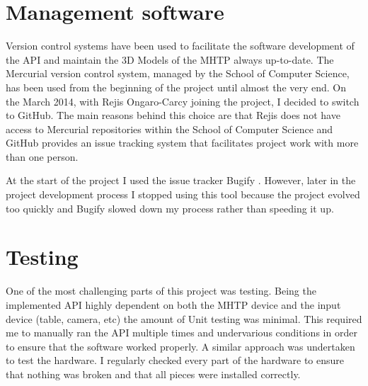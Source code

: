 \section{Management software}
Version control systems have been used to facilitate the software development of the API and maintain the 3D Models of the MHTP always up-to-date. The Mercurial version control system, managed by the School of Computer Science, has been used from the beginning of the project until almost the very end. On the  March 2014, with Rejis Ongaro-Carcy joining the project, I decided to switch to GitHub. The main reasons behind this choice are that Rejis does not have access to Mercurial repositories within the School of Computer Science and GitHub provides an issue tracking system that facilitates project work with more than one person.  

At the start of the project I used the issue tracker Bugify . However, later in the project development process I stopped using this tool because the project evolved too quickly and Bugify slowed down my process rather than speeding it up. 

\section{Testing}
One of the most challenging parts of this project was testing. Being the implemented API highly dependent on both the MHTP device and the input device (table, camera, etc) the amount of Unit testing was minimal. This required me to manually ran the API multiple times and undervarious conditions in order to ensure that the software worked properly. A similar approach was undertaken to test the hardware. I regularly checked every part of the hardware to ensure that nothing was broken and that all pieces were installed correctly.